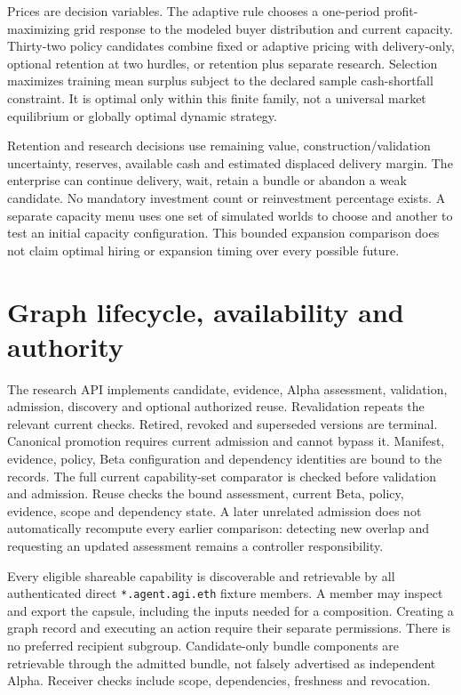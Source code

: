 \documentclass[11pt,letterpaper]{article}
\begin{document}
Prices are decision variables. The adaptive rule chooses a one-period
profit-maximizing grid response to the modeled buyer distribution and current
capacity. Thirty-two policy candidates combine fixed or adaptive pricing with
delivery-only, optional retention at two hurdles, or retention plus separate
research. Selection maximizes training mean surplus subject to the declared
sample cash-shortfall constraint. It is optimal only within this finite family,
not a universal market equilibrium or globally optimal dynamic strategy.

Retention and research decisions use remaining value, construction/validation
uncertainty, reserves, available cash and estimated displaced delivery margin.
The enterprise can continue delivery, wait, retain a bundle or abandon a weak
candidate. No mandatory investment count or reinvestment percentage exists.
A separate capacity menu uses one set of simulated worlds to choose and another
to test an initial capacity configuration. This bounded expansion comparison
does not claim optimal hiring or expansion timing over every possible future.

\section{Graph lifecycle, availability and authority}

The research API implements candidate, evidence, Alpha assessment, validation,
admission, discovery and optional authorized reuse. Revalidation repeats the
relevant current checks. Retired, revoked and superseded versions are terminal.
Canonical promotion requires current admission and cannot bypass it. Manifest,
evidence, policy, Beta configuration and dependency identities are bound to the
records. The full current capability-set comparator is checked before validation
and admission. Reuse checks the bound assessment, current Beta, policy, evidence,
scope and dependency state. A later unrelated admission does not automatically
recompute every earlier comparison: detecting new overlap and requesting an
updated assessment remains a controller responsibility.

Every eligible shareable capability is discoverable and retrievable by all
authenticated direct \texttt{*.agent.agi.eth} fixture members. A member may inspect
and export the capsule, including the inputs needed for a composition. Creating
a graph record and executing an action require their separate permissions.
There is no preferred recipient subgroup. Candidate-only bundle components are
retrievable through the admitted bundle, not falsely advertised as independent
Alpha. Receiver checks include scope, dependencies, freshness and revocation.
\end{document}
